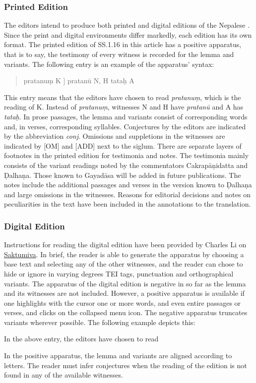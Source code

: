 \subsubsection{Printed Edition}
The editors intend to produce both printed and digital editions of the Nepalese \SS. Since the print and digital environments differ markedly, each edition has its own format. The printed edition of SS.1.16 in this article has a positive apparatus, that is to say, the testimony of every witness is recorded for the lemma and variants. The following entry is an example of the apparatus' syntax:
\begin{quote}
pratanuṃ K ]  pratanū N, H tataḥ A
\end{quote}
This entry means that the editors have chosen to read \emph{pratanuṃ}, which is the reading of K. Instead of \emph{pratanuṃ}, witnesses N and H have \emph{pratanū} and A has \emph{tataḥ}. In prose passages, the lemma and variants consist of corresponding words and, in verses, corresponding syllables. Conjectures by the editors are indicated by the abbreviation \emph{conj}. Omissions and suppletions in the witnesses are indicated by \textsc{[OM]} and \textsc{[ADD]} next to the siglum. There are separate layers of footnotes in the printed edition for testimonia and notes. The testimonia mainly consists of the variant readings noted by the commentators Cakrapāṇidatta and Ḍalhaṇa. Those known to Gayadāsa will be added in future publications. The notes include the additional passages and verses in the version known to Ḍalhaṇa and large omissions in the witnesses. Reasons for editorial decisions and notes on peculiarities in the text have been included in the annotations to the translation.

\subsubsection{Digital Edition}
Instructions for reading the digital edition have been provided by Charles Li on \href{https://saktumiva.org/wiki/users}{Saktumiva}. In brief, the reader is able to generate the apparatus by choosing a base text and selecting any of the other witnesses, and the reader can chose to hide or ignore in varying degrees TEI tags, punctuation and orthographical variants. The apparatus of the digital edition is negative in so far as the lemma and its witnesses are not included. However, a positive apparatus is available if one highlights with the cursor one or more words, and even entire passages or verses, and clicks on the collapsed menu icon. The negative apparatus truncates variants wherever possible. The following example depicts this:


In the above entry, the editors have chosen to read

In the positive apparatus, the lemma and variants are aligned according to letters. The reader must infer conjectures when the reading of the edition is not found in any of the available witnesses.  




